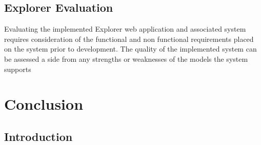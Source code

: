 \documentclass[10pt]{report}
\begin{document}
\clearpage
\section{Explorer Evaluation}
Evaluating the implemented Explorer web application and associated system requires consideration of the functional and non functional requirements placed on the system prior to development. The quality of the implemented system can be assessed a side from any strengths or weaknesses of the models the system supports



%
%
%
%
\chapter{Conclusion}

\section{Introduction}

\renewcommand{\baselinestretch}{1.0}\normalsize


\end{document}
